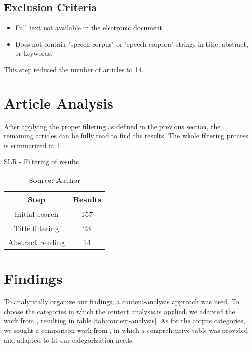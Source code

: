 \subsection*{Exclusion Criteria}

\begin{itemize}
    \item Full text not available in the electronic document
    \item Does not contain "speech corpus" or "speech corpora" strings in title, abstract, or keywords.
\end{itemize}

This step reduced the number of articles to 14.

\section{Article Analysis}

After applying the proper filtering as defined in the previous section, the remaining articles can be fully read to find the results. The whole filtering process is summarized in \ref{tab:slr-filtering}.

\begin{table}[h]
    \centering
    \caption{SLR - Filtering of results}
    \begin{tabular}{|c|c|}
        \hline Step & Results \\ \hline
        Initial search & 157 \\ \hline
        Title filtering & 23 \\ \hline
        Abstract reading & 14 \\ \hline
    \end{tabular}
    \caption*{Source: Author}
    \label{tab:slr-filtering}
\end{table}

\section{Findings}

To analytically organize our findings, a content-analysis approach was used. To choose the categories in which the content analysis is applied, we adapted the work from \cite{queiroz2019blockchain}, resulting in table \ref{tab:content-analysis}. As for the corpus categories, we sought a comparison work from \cite{LeRouxVincent2014TRdatasets}, in which a comprehensive table was provided and adapted to fit our categorization needs.

